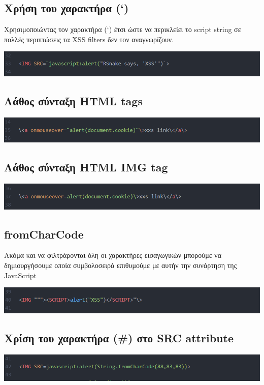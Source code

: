 \subsection{Χρήση του χαρακτήρα (`)}
\noindent
Χρησιμοποιώντας τον χαρακτήρα (`) έτσι ώστε να περικλείει το script string σε πολλές περιπτώσεις τα XSS filters δεν τον αναγνωρίζουν.
\begin{center}
			\includegraphics[width=1\textwidth]{image/11.PNG}		
\end{center}

\subsection{Λάθος σύνταξη HTML tags}
\begin{center}
			\includegraphics[width=1\textwidth]{image/12.PNG}		
\end{center}
\subsection{Λάθος σύνταξη HTML IMG tag}
\begin{center}
			\includegraphics[width=1\textwidth]{image/13.PNG}		
\end{center}
\subsection{fromCharCode}
\noindent
Ακόμα και να φιλτράρονται όλη οι χαρακτήρες εισαγωγικών μπορούμε να δημιουργήσουμε οποία συμβολοσειρά επιθυμούμε με αυτήν την συνάρτηση της JavaScript
\begin{center}
			\includegraphics[width=1\textwidth]{image/14.PNG}		
\end{center}
\subsection{Χρίση του χαρακτήρα (\#) στο SRC attribute }
\begin{center}
			\includegraphics[width=1\textwidth]{image/15.PNG}		
\end{center}
